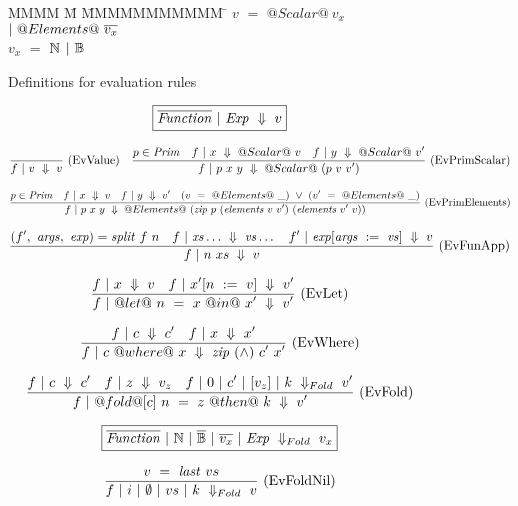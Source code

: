 
\begin{figure}
\begin{tabbing}
MMMM \= M \= MMMMMMMMMMM \= \kill
$v$  \> $=$ \> $@Scalar@~v_x$ \> $|~ @Elements@~\overline{v_x}$ \\
$v_x$\> $=$ \> $\mathbb{N}$ \> $|~ \mathbb{B}$ \\
\end{tabbing}

\caption{Definitions for evaluation rules}
\label{fig:source:eval}
\end{figure}

\begin{figure*}

$$
\boxed{\overline{\mathit{Function}} ~|~ \mathit{Exp} ~\Downarrow~ v}
$$

$$
\frac {\displaystyle 
} {\displaystyle 
    f ~|~ v ~\Downarrow~ v
} \ 
\textrm{(EvValue)}
\quad
\frac {\displaystyle 
    p \in \mathit{Prim}
    \quad
    f ~|~ x ~\Downarrow~ @Scalar@~v
    \quad
    f ~|~ y ~\Downarrow~ @Scalar@~v'
} {\displaystyle 
    f ~|~ p~x~y ~\Downarrow~ @Scalar@~(p~v~v')
} \ 
\textrm{(EvPrimScalar)}
$$

$$
\frac {\displaystyle 
    p \in \mathit{Prim}
    \quad
    f ~|~ x ~\Downarrow~ v
    \quad
    f ~|~ y ~\Downarrow~ v'
    \quad
    (v~=~@Elements@~\_)~\vee~(v'~=~@Elements@~\_)
} {\displaystyle 
    f ~|~ p~x~y ~\Downarrow~ @Elements@~(\mathit{zip}~p~(\mathit{elements}~v~v')~(\mathit{elements}~v'~v))
} \ 
\textrm{(EvPrimElements)}
$$

$$
\frac {\displaystyle 
    (f',~\mathit{args},~\mathit{exp}) = \mathit{split}~f~n
    \quad
    f ~|~ \mathit{xs}\ldots ~\Downarrow~ \mathit{vs}\ldots
    \quad
    f' ~|~ \mathit{exp}[\mathit{args}~:=~\mathit{vs}] ~\Downarrow~ v
} {\displaystyle 
    f ~|~ n~xs ~\Downarrow~ v
} \ 
\textrm{(EvFunApp)}
$$

$$
\frac {\displaystyle 
    f ~|~ x ~\Downarrow~ v
    \quad
    f ~|~ x'[n~:=~v] ~\Downarrow~ v'
} {\displaystyle 
    f ~|~ @let@~n~=~x~@in@~x' ~\Downarrow~ v'
} \ 
\textrm{(EvLet)}
$$

$$
\frac {\displaystyle 
    f ~|~ c ~\Downarrow~ c'
    \quad
    f ~|~ x ~\Downarrow~ x'
} {\displaystyle 
    f ~|~ c~@where@~x ~\Downarrow~ \mathit{zip}~(\wedge)~c'~x'
} \ 
\textrm{(EvWhere)}
$$

$$
\frac {\displaystyle 
    f ~|~ c ~\Downarrow~ c'
    \quad
    f ~|~ z ~\Downarrow~ v_z
    \quad
    f~|~0~|~c'~|~[v_z]~|~k~\Downarrow_{Fold}~v'
} {\displaystyle 
    f ~|~ @fold@[c]~n~=~z~@then@~k ~\Downarrow~ v'
} \ 
\textrm{(EvFold)}
$$

$$
\boxed{\overline{\mathit{Function}}~|~\mathbb{N}~|~\overline{\mathbb{B}}~|~\overline{v_x}~|~\mathit{Exp}~\Downarrow_{Fold}~v_x}
$$

$$
\frac {\displaystyle 
    v~=~\mathit{last}~vs
} {\displaystyle 
    f~|~i~|~\emptyset~|~vs~|~k~\Downarrow_{Fold}~v
} \ 
\textrm{(EvFoldNil)}
$$


\end{figure*}
